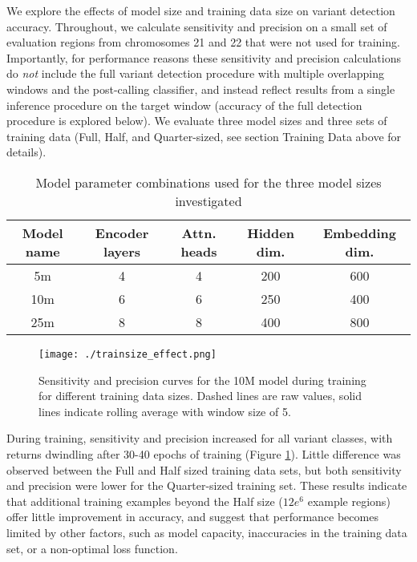 \documentclass[]{article}
\begin{document}
We explore the effects of model size and training data size on variant detection accuracy. Throughout, we calculate sensitivity and precision on a small set of evaluation regions from chromosomes 21 and 22 that were not used for training. Importantly, for performance reasons these sensitivity and precision calculations do \textit{not} include the full variant detection procedure with multiple overlapping windows and the post-calling classifier, and instead reflect results from a single inference procedure on the target window (accuracy of the full detection procedure is explored below).  We evaluate three model sizes and three sets of training data (Full, Half, and Quarter-sized, see section Training Data above for details).

\begin{center}
	\begin{table}
	\begin{tabular}{ ccccc }
	 Model name & Encoder layers & Attn. heads & Hidden dim. & Embedding dim. \\ 
	\hline
	 5m & 4 & 4 & 200 & 600 \\ 
	 10m & 6 & 6 & 250 & 400 \\ 
	 25m & 8 & 8 & 400 & 800 \\ 
	 \hline
	\end{tabular}
	\caption{ Model parameter combinations used for the three model sizes investigated }
\end{table}
\end{center}

\begin{figure}[htp]
	\texttt{[image: ./trainsize\_effect.png]}
	\caption{ Sensitivity and precision curves for the 10M model during training for different training data sizes. Dashed lines are raw values, solid lines indicate rolling average with window size of 5. }
	\label{fig:trainsize}
\end{figure}

During training, sensitivity and precision increased for all variant classes, with returns dwindling after 30-40 epochs of training (Figure \ref{fig:trainsize}). Little difference was observed between the Full and Half sized training data sets, but both sensitivity and precision were lower for the Quarter-sized training set. These results indicate that additional training examples beyond the Half size ($12e^6$ example regions) offer little improvement in accuracy, and suggest that performance becomes limited by other factors, such as model capacity, inaccuracies in the training data set, or a non-optimal loss function. 
\end{document}
